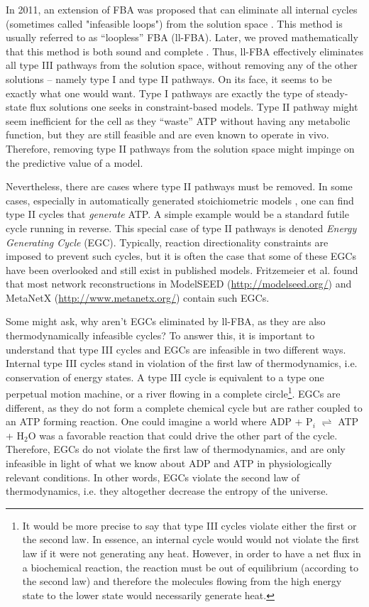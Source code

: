 \documentclass[twocolumn]{bmcart}%
\begin{document}
In 2011, an extension of FBA was proposed that can eliminate all internal cycles (sometimes called "infeasible loops") from the solution space \cite{Schellenberger2011-bq}. This method is usually referred to as ``loopless'' FBA (ll-FBA). Later, we proved mathematically that this method is both sound and complete \cite{Noor2012-qb}. Thus, ll-FBA effectively eliminates all type III pathways from the solution space, without removing any of the other solutions -- namely type I and type II pathways. On its face, it seems to be exactly what one would want. Type I pathways are exactly the type of steady-state flux solutions one seeks in constraint-based models. Type II pathway might seem inefficient for the cell as they ``waste'' ATP without having any metabolic function, but they are still feasible and are even known to operate in vivo. Therefore, removing type II pathways from the solution space might impinge on the predictive value of a model.

Nevertheless, there are cases where type II pathways must be removed. In some cases, especially in automatically generated stoichiometric models \cite{Fritzemeier2017-ba}, one can find type II cycles that \textit{generate} ATP. A simple example would be a standard futile cycle running in reverse. This special case of type II pathways is denoted \textit{Energy Generating Cycle} (EGC). Typically, reaction directionality constraints are imposed to prevent such cycles, but it is often the case that some of these EGCs have been overlooked and still exist in published models. Fritzemeier et al. \cite{Fritzemeier2017-ba} found that most network reconstructions in ModelSEED (\url{http://modelseed.org/}) and MetaNetX (\url{http://www.metanetx.org/}) contain such EGCs.

Some might ask, why aren't EGCs eliminated by ll-FBA, as they are also thermodynamically infeasible cycles? To answer this, it is important to understand that type III cycles and EGCs are infeasible in two different ways. Internal type III cycles stand in violation of the first law of thermodynamics, i.e. conservation of energy states. A type III cycle is equivalent to a type one perpetual motion machine, or a river flowing in a complete circle\footnote{It would be more precise to say that type III cycles violate either the first or the second law. In essence, an internal cycle would would not violate the first law if it were not generating any heat. However, in order to have a net flux in a biochemical reaction, the reaction must be out of equilibrium (according to the second law) and therefore the molecules flowing from the high energy state to the lower state would necessarily generate heat.}. EGCs are different, as they do not form a complete chemical cycle but are rather coupled to an ATP forming reaction. One could imagine a world where ADP + P$_i$ $\rightleftharpoons$ ATP + H$_2$O was a favorable reaction that could drive the other part of the cycle. Therefore, EGCs do not violate the first law of thermodynamics, and are only infeasible in light of what we know about ADP and ATP in physiologically relevant conditions. In other words, EGCs violate the second law of thermodynamics, i.e. they altogether decrease the entropy of the universe.
\end{document}

